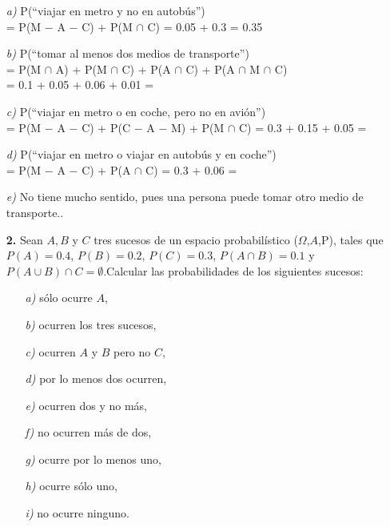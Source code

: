 \documentclass[11pt,a4paper]{article}
\theoremstyle{definition}
\begin{document}
	\begin{itemize}
		\item[\emph{a)}] P(``viajar en metro y no en autobús'')\\
		\hspace*{0.5cm}= P(M $-$ A $-$ C) + P(M $\cap$ C) = 0.05 + 0.3 = 0.35
		\item[\emph{b)}] P(``tomar al menos dos medios de transporte'')\\
		\hspace*{0.5cm}= P(M $\cap$ A) + P(M $\cap$ C) + P(A $\cap$ C) + P(A $\cap$ M $\cap$ C)\\
		\hspace*{0.5cm}= 0.1 + 0.05 + 0.06 + 0.01 = 
		\item[\emph{c)}] P(``viajar en metro o en coche, pero no en avión'')\\
		\hspace*{0.5cm} = P(M $-$ A $-$ C) + P(C $-$ A $-$ M) + P(M $\cap$ C) = 0.3 + 0.15 + 0.05 =
		\item[\emph{d)}] P(``viajar en metro o viajar en autobús y en coche'')\\
		\hspace*{0.5cm} = P(M $-$ A $-$ C) + P(A $\cap$ C) = 0.3 + 0.06 =
		\item[\emph{e)}] No tiene mucho sentido, pues una persona puede tomar otro medio de transporte..
	\end{itemize}




\pagebreak

\begin{itemize}
	\item[\textbf{2.}] Sean $A, B$ y $C$ tres sucesos de un espacio probabilístico ($\Omega$,$A$,P), tales que $P(A)=0.4$, $P(B)=0.2$, $P(C)=0.3$, $P(A\cap B)=0.1$ y $P(A\cup B)\cap C=\emptyset$.Calcular las probabilidades de los siguientes sucesos:
	

	\begin{itemize}
		\item[\emph{a)}] sólo ocurre $A$,
		\item[\emph{b)}] ocurren los tres sucesos,
		\item[\emph{c)}] ocurren $A$ y $B$ pero no $C$,
		\item[\emph{d)}] por lo menos dos ocurren,
		\item[\emph{e)}] ocurren dos y no más,
		\item[\emph{f)}] no ocurren más de dos,
		\item[\emph{g)}] ocurre por lo menos uno,
		\item[\emph{h)}] ocurre sólo uno,
		\item[\emph{i)}] no ocurre ninguno.
	\end{itemize}
\end{itemize}
\end{document}

